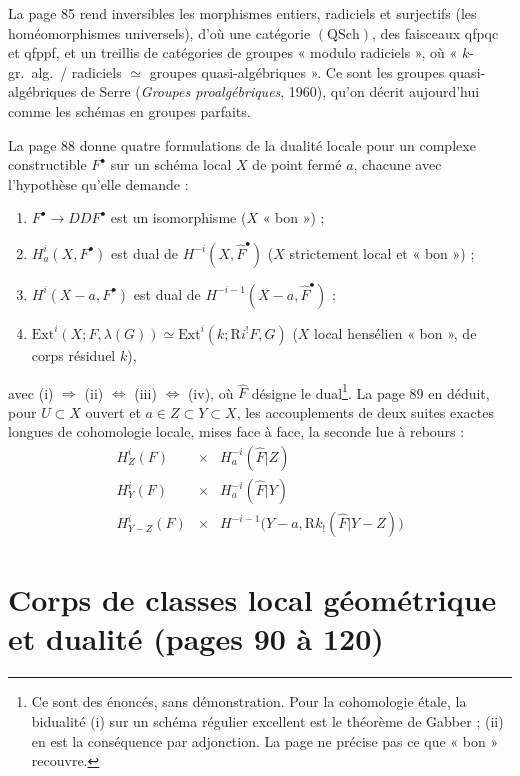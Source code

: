 \documentclass[11pt,a4paper]{article}
\begin{document}
La page 85 rend inversibles les morphismes entiers, radiciels et surjectifs
(les homéomorphismes universels), d'où une catégorie $(\mathrm{QSch})$, des
faisceaux qfpqc et qfppf, et un treillis de catégories de groupes « modulo
radiciels », où « $k$-gr.\ alg.\ / radiciels $\simeq$ groupes
quasi-algébriques ». Ce sont les groupes quasi-algébriques de Serre
(\emph{Groupes proalgébriques}, 1960), qu'on décrit aujourd'hui comme les schémas
en groupes parfaits.

La page 88 donne quatre formulations de la dualité locale pour un complexe
constructible $F^{\bullet}$ sur un schéma local $X$ de point fermé $a$, chacune
avec l'hypothèse qu'elle demande :
\begin{enumerate}
\item[(i)] $F^{\bullet} \to DDF^{\bullet}$ est un isomorphisme ($X$ « bon ») ;
\item[(ii)] $H^i_a(X, F^{\bullet})$ est dual de $H^{-i}(X, \hat F^{\bullet})$ ($X$
strictement local et « bon ») ;
\item[(iii)] $H^i(X - a, F^{\bullet})$ est dual de $H^{-i-1}(X - a, \hat F^{\bullet})$ ;
\item[(iv)] $\mathrm{Ext}^i(X; F, \lambda(G)) \simeq \mathrm{Ext}^i(k;
\mathrm{R}i^{!}F, G)$ ($X$ local hensélien « bon », de corps résiduel $k$),
\end{enumerate}
avec (i) $\Rightarrow$ (ii) $\Leftrightarrow$ (iii) $\Leftrightarrow$ (iv), où $\hat
F$ désigne le dual\footnote{Ce sont des énoncés, sans démonstration. Pour la
cohomologie étale, la bidualité (i) sur un schéma régulier excellent est le
théorème de Gabber ; (ii) en est la conséquence par adjonction. La page ne
précise pas ce que « bon » recouvre.}. La page 89 en déduit, pour $U \subset X$
ouvert et $a \in Z \subset Y \subset X$, les accouplements de deux suites exactes
longues de cohomologie locale, mises face à face, la seconde lue à rebours :
\[
\begin{array}{ccc}
H^i_Z(F) & \times & H^{-i}_a(\hat F|Z) \\
H^i_Y(F) & \times & H^{-i}_a(\hat F|Y) \\
H^i_{Y-Z}(F) & \times & H^{-i-1}\bigl(Y - a, \mathrm{R}k_{!}(\hat F|Y - Z)\bigr)
\end{array}
\]

\section*{Corps de classes local géométrique et dualité (pages 90 à 120)}
\end{document}
